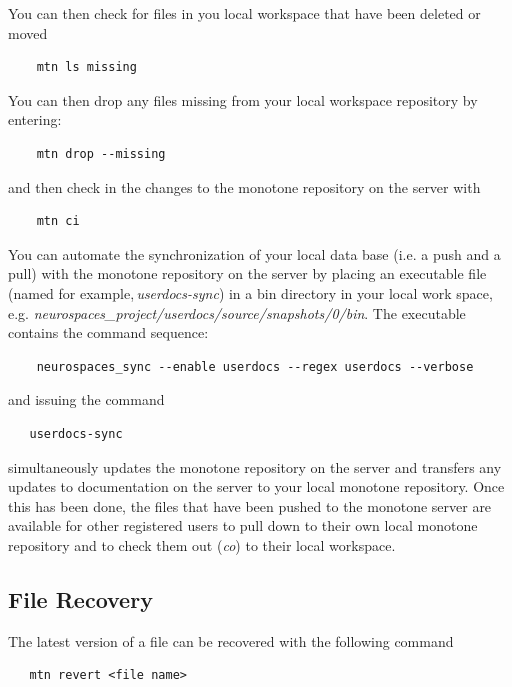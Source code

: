 \documentclass[12pt]{article}
\begin{document}
You can then check for files in you local workspace that have been deleted or moved
\begin{verbatim}
    mtn ls missing
\end{verbatim}
You can then drop any files missing from your local workspace repository by entering:
\begin{verbatim}
    mtn drop --missing
\end{verbatim}
and then check in the changes to the monotone repository on the server with
\begin{verbatim}
    mtn ci
\end{verbatim}
You can automate the synchronization of your local data base (i.e. a push and a pull) with the monotone repository on the server by placing an executable file (named for example,\,{\it userdocs-sync}) in a bin directory in your local work space, e.g. {\it neurospaces\_project/userdocs/source/snapshots/0/bin}. 
The executable contains the command sequence:
\begin{verbatim}
    neurospaces_sync --enable userdocs --regex userdocs --verbose
\end{verbatim}
and issuing the command
\begin{verbatim}
   userdocs-sync
\end{verbatim}
simultaneously updates the monotone repository on the server and transfers any updates to documentation on the server to your local monotone repository. Once this has been done, the files that have been pushed to the monotone server are available for other registered users to pull down to their own local monotone repository and to check them out ({\it co}) to their local workspace.

\subsection*{File Recovery}

The latest version of a file can be recovered with the following command
\begin{verbatim}
   mtn revert <file name>
\end{verbatim}
\end{document}
